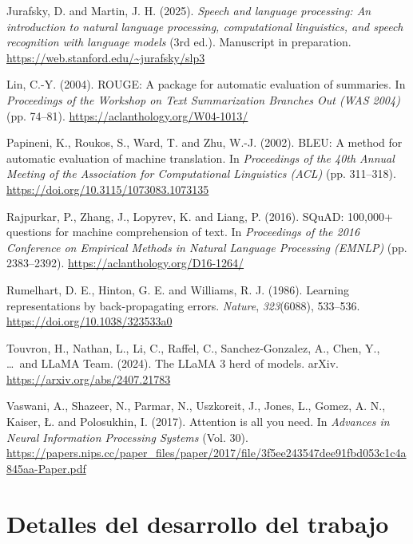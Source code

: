 \documentclass[12pt,twoside]{article}
\begin{document}
\begin{thebibliography}{100}
 Jurafsky, D. and Martin, J. H. (2025). \textit{Speech and language processing: An introduction to natural language processing, computational linguistics, and speech recognition with language models} (3rd ed.). Manuscript in preparation. \url{https://web.stanford.edu/~jurafsky/slp3}

 Lin, C.-Y. (2004). ROUGE: A package for automatic evaluation of summaries. In \textit{Proceedings of the Workshop on Text Summarization Branches Out (WAS 2004)} (pp. 74--81). \url{https://aclanthology.org/W04-1013/}

 Papineni, K., Roukos, S., Ward, T. and Zhu, W.-J. (2002). BLEU: A method for automatic evaluation of machine translation. In \textit{Proceedings of the 40th Annual Meeting of the Association for Computational Linguistics (ACL)} (pp. 311--318). \url{https://doi.org/10.3115/1073083.1073135}

 Rajpurkar, P., Zhang, J., Lopyrev, K. and Liang, P. (2016). SQuAD: 100,000+ questions for machine comprehension of text. In \textit{Proceedings of the 2016 Conference on Empirical Methods in Natural Language Processing (EMNLP)} (pp. 2383--2392). \url{https://aclanthology.org/D16-1264/}

 Rumelhart, D. E., Hinton, G. E. and Williams, R. J. (1986). Learning representations by back-propagating errors. \textit{Nature}, \textit{323}(6088), 533--536. \url{https://doi.org/10.1038/323533a0}

 Touvron, H., Nathan, L., Li, C., Raffel, C., Sanchez-Gonzalez, A., Chen, Y., \ldots\ and LLaMA Team. (2024). The LLaMA 3 herd of models. arXiv. \url{https://arxiv.org/abs/2407.21783}

 Vaswani, A., Shazeer, N., Parmar, N., Uszkoreit, J., Jones, L., Gomez, A. N., Kaiser, Ł. and Polosukhin, I. (2017). Attention is all you need. In \textit{Advances in Neural Information Processing Systems} (Vol. 30). \url{https://papers.nips.cc/paper_files/paper/2017/file/3f5ee243547dee91fbd053c1c4a845aa-Paper.pdf}





\end{thebibliography}


\newpage
\appendix

\section{Detalles del desarrollo del trabajo}
\end{document}
